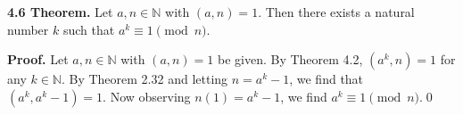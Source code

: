 \documentclass[12pt]{article}
\begin{document}
\noindent\textbf{4.6 Theorem.} Let $a,n\in\mathbb{N}$ with $(a,n)=1$. Then there exists a natural number $k$ such that $a^k\equiv 1\pmod n$. 

\bigskip

\noindent\textbf{Proof.} Let $a,n\in\mathbb{N}$ with $(a,n)=1$ be given. By Theorem 4.2, $(a^k,n)=1$ for any $k\in\mathbb{N}$. By Theorem 2.32 and letting $n=a^k-1$, we find that $(a^k,a^k-1)=1$. Now observing $n(1)=a^k-1$, we find $a^k\equiv 1\pmod n$.\qed
\end{document}
